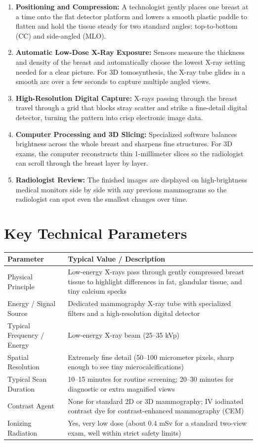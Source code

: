 \begin{enumerate}
    \item \textbf{Positioning and Compression:} A technologist gently places one breast at a time onto the flat detector platform and lowers a smooth plastic paddle to flatten and hold the tissue steady for two standard angles: top-to-bottom (CC) and side-angled (MLO).
    \item \textbf{Automatic Low-Dose X-Ray Exposure:} Sensors measure the thickness and density of the breast and automatically choose the lowest X-ray setting needed for a clear picture. For 3D tomosynthesis, the X-ray tube glides in a smooth arc over a few seconds to capture multiple angled views.
    \item \textbf{High-Resolution Digital Capture:} X-rays passing through the breast travel through a grid that blocks stray scatter and strike a fine-detail digital detector, turning the pattern into crisp electronic image data.
    \item \textbf{Computer Processing and 3D Slicing:} Specialized software balances brightness across the whole breast and sharpens fine structures. For 3D exams, the computer reconstructs thin 1-millimeter slices so the radiologist can scroll through the breast layer by layer.
    \item \textbf{Radiologist Review:} The finished images are displayed on high-brightness medical monitors side by side with any previous mammograms so the radiologist can spot even the smallest changes over time.
\end{enumerate}

\section{Key Technical Parameters}

\noindent\begin{tabularx}{\textwidth}{@{}l X@{}}
\toprule
\textbf{Parameter} & \textbf{Typical Value / Description} \\
\midrule
Physical Principle & Low-energy X-rays pass through gently compressed breast tissue to highlight differences in fat, glandular tissue, and tiny calcium specks \\
Energy / Signal Source & Dedicated mammography X-ray tube with specialized filters and a high-resolution digital detector \\
Typical Frequency / Energy & Low-energy X-ray beam (25--35 kVp) \\
Spatial Resolution & Extremely fine detail (50--100 micrometer pixels, sharp enough to see tiny microcalcifications) \\
Typical Scan Duration & 10--15 minutes for routine screening; 20--30 minutes for diagnostic or extra magnified views \\
Contrast Agent & None for standard 2D or 3D mammography; IV iodinated contrast dye for contrast-enhanced mammography (CEM) \\
Ionizing Radiation & Yes, very low dose (about 0.4 mSv for a standard two-view exam, well within strict safety limits) \\
\bottomrule
\end{tabularx}

